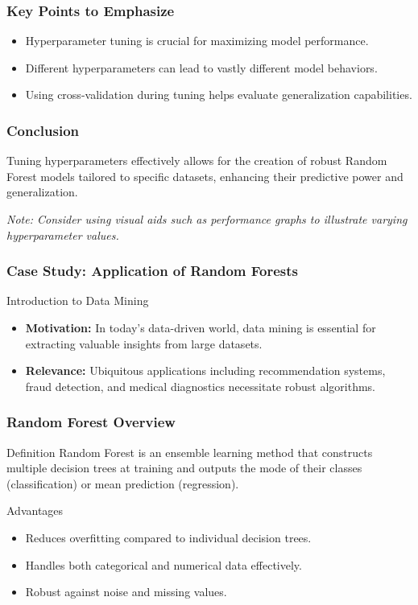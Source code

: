 \documentclass[aspectratio=169]{beamer}
\begin{document}
\begin{frame}
    \frametitle{Key Points to Emphasize}
    \begin{itemize}
        \item Hyperparameter tuning is crucial for maximizing model performance.
        \item Different hyperparameters can lead to vastly different model behaviors.
        \item Using cross-validation during tuning helps evaluate generalization capabilities.
    \end{itemize}
\end{frame}

\begin{frame}
    \frametitle{Conclusion}
    Tuning hyperparameters effectively allows for the creation of robust Random Forest models tailored to specific datasets, enhancing their predictive power and generalization.
    
    \textit{Note: Consider using visual aids such as performance graphs to illustrate varying hyperparameter values.}
\end{frame}

\begin{frame}
    \frametitle{Case Study: Application of Random Forests}
    \begin{block}{Introduction to Data Mining}
        \begin{itemize}
            \item \textbf{Motivation:} In today’s data-driven world, data mining is essential for extracting valuable insights from large datasets.
            \item \textbf{Relevance:} Ubiquitous applications including recommendation systems, fraud detection, and medical diagnostics necessitate robust algorithms.
        \end{itemize}
    \end{block}
\end{frame}

\begin{frame}
    \frametitle{Random Forest Overview}
    \begin{block}{Definition}
        Random Forest is an ensemble learning method that constructs multiple decision trees at training and outputs the mode of their classes (classification) or mean prediction (regression).
    \end{block}
    \begin{block}{Advantages}
        \begin{itemize}
            \item Reduces overfitting compared to individual decision trees.
            \item Handles both categorical and numerical data effectively.
            \item Robust against noise and missing values.
        \end{itemize}
    \end{block}
\end{frame}
\end{document}
